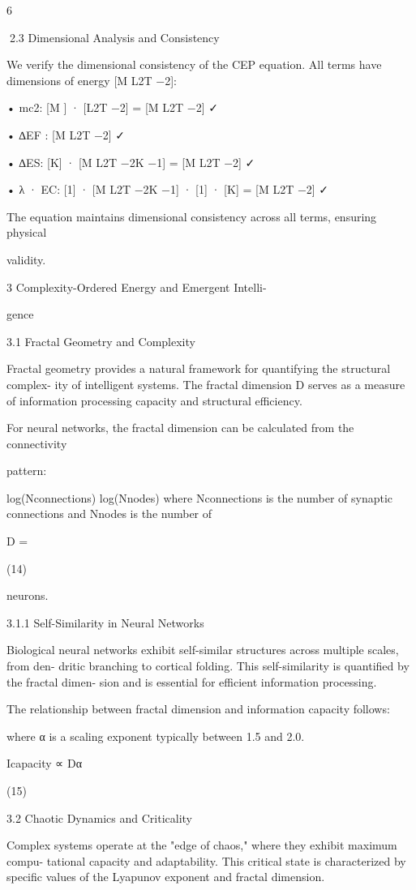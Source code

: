 6

2.3 Dimensional Analysis and Consistency

We verify the dimensional consistency of the CEP equation. All terms have dimensions
of energy [M L2T −2]:

• mc2: [M ] · [L2T −2] = [M L2T −2] ✓

• ∆EF : [M L2T −2] ✓

• ∆ES: [K] · [M L2T −2K −1] = [M L2T −2] ✓

• λ · EC: [1] · [M L2T −2K −1] · [1] · [K] = [M L2T −2] ✓

The equation maintains dimensional consistency across all terms, ensuring physical

validity.

3 Complexity-Ordered Energy and Emergent Intelli-

gence

3.1 Fractal Geometry and Complexity

Fractal geometry provides a natural framework for quantifying the structural complex-
ity of intelligent systems. The fractal dimension D serves as a measure of information
processing capacity and structural efficiency.

For neural networks, the fractal dimension can be calculated from the connectivity

pattern:

log(Nconnections)
log(Nnodes)
where Nconnections is the number of synaptic connections and Nnodes is the number of

D =

(14)

neurons.

3.1.1 Self-Similarity in Neural Networks

Biological neural networks exhibit self-similar structures across multiple scales, from den-
dritic branching to cortical folding. This self-similarity is quantified by the fractal dimen-
sion and is essential for efficient information processing.

The relationship between fractal dimension and information capacity follows:

where α is a scaling exponent typically between 1.5 and 2.0.

Icapacity ∝ Dα

(15)

3.2 Chaotic Dynamics and Criticality

Complex systems operate at the "edge of chaos," where they exhibit maximum compu-
tational capacity and adaptability. This critical state is characterized by specific values
of the Lyapunov exponent and fractal dimension.

